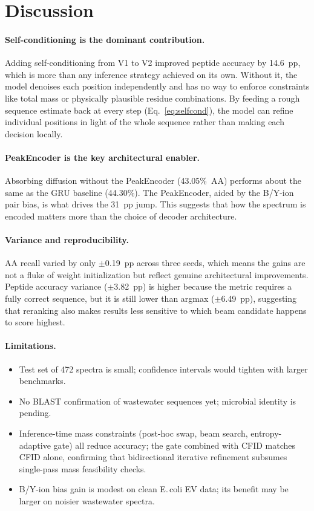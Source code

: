 \documentclass[10pt,twocolumn]{article}
\begin{document}
\section{Discussion}

\paragraph{Self-conditioning is the dominant contribution.}
Adding self-conditioning from V1 to V2 improved peptide accuracy by 14.6~pp, which is more than
any inference strategy achieved on its own.
Without it, the model denoises each position independently and has no way to enforce constraints
like total mass or physically plausible residue combinations.
By feeding a rough sequence estimate back at every step (Eq.~\ref{eq:selfcond}), the model can
refine individual positions in light of the whole sequence rather than making each decision locally.

\paragraph{PeakEncoder is the key architectural enabler.}
Absorbing diffusion without the PeakEncoder (43.05\%~AA) performs about the same as the
GRU baseline (44.30\%).
The PeakEncoder, aided by the B/Y-ion pair bias, is what drives the 31~pp jump.
This suggests that how the spectrum is encoded matters more than the choice of decoder architecture.

\paragraph{Variance and reproducibility.}
AA recall varied by only $\pm$0.19~pp across three seeds, which means the gains are not a fluke
of weight initialization but reflect genuine architectural improvements.
Peptide accuracy variance ($\pm$3.82~pp) is higher because the metric requires a fully correct
sequence, but it is still lower than argmax ($\pm$6.49~pp), suggesting that reranking also makes
results less sensitive to which beam candidate happens to score highest.

\paragraph{Limitations.}
\begin{itemize}[leftmargin=*,itemsep=1pt,topsep=2pt]
\item Test set of 472 spectra is small; confidence intervals would tighten with larger benchmarks.
\item No BLAST confirmation of wastewater sequences yet; microbial identity is pending.
\item Inference-time mass constraints (post-hoc swap, beam search, entropy-adaptive gate) all reduce accuracy; the gate combined with CFID matches CFID alone, confirming that bidirectional iterative refinement subsumes single-pass mass feasibility checks.
\item B/Y-ion bias gain is modest on clean E.\,coli EV data; its benefit may be larger on noisier wastewater spectra.
\end{itemize}
\end{document}
